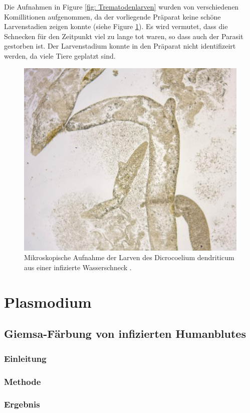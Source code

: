\documentclass[oneside,10pt,a4paper]{report}
\begin{document}
				Die Aufnahmen in Figure \ref{fig: Trematodenlarven} wurden von verschiedenen Komillitionen aufgenommen, da der vorliegende Präparat keine schöne Larvenstadien zeigen konnte (siehe Figure \ref{fig: crapTrematodenlarven}). Es wird vermutet, dass die Schnecken für den Zeitpunkt viel zu lange tot waren, so dass auch der Parasit gestorben ist. Der Larvenstadium konnte in den Präparat nicht identifizeirt werden, da viele Tiere geplatzt sind.
				
				\begin{figure}[H]
					\centering
					\includegraphics[scale=0.5]{Trematodenlarven.jpg}
					\caption{Mikroskopische Aufnahme der Larven des Dicrocoelium dendriticum aus einer infizierte Wasserschneck .}
					\label{fig: crapTrematodenlarven}
				\end{figure}
	
	\chapter{Plasmodium}
		\section{Giemsa-Färbung von infizierten Humanblutes}
			\subsection{Einleitung}
			\subsection{Methode}
			\subsection{Ergebnis}
\end{document}
